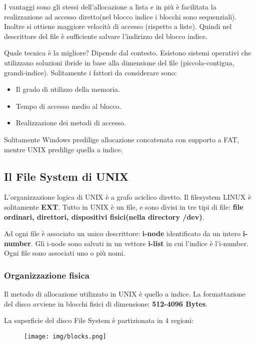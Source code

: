 \documentclass{article}
\begin{document}
\noindent I vantaggi sono gli stessi dell'allocazione a lista 
e in più è facilitata la realizzazione ad accesso diretto(nel blocco 
indice i blocchi sono sequenziali). Inoltre si ottiene
maggiore velocità di accesso (rispetto a liste).
\noindent Quindi nel descrittore del file è sufficiente 
salvare l'indirizzo del blocco indice.
\medskip

\noindent Quale tecnica è la migliore? Dipende dal contesto. 
Esistono sistemi operativi che utilizzano soluzioni ibride in base
alla dimensione del file (piccola-contigua, grandi-indice).
Solitamente i fattori da considerare sono:
\begin{itemize}
    \item Il grado di utilizzo della memoria.
    \item Tempo di accesso medio al blocco.
    \item Realizzazione dei metodi di accesso.
\end{itemize}

\noindent Solitamente Windows predilige allocazione concatenata con
supporto a FAT, mentre UNIX predilige quella a indice.

\subsection{Il File System di UNIX}
L'organizzazione logica di UNIX è a grafo aciclico diretto.
Il filesystem LINUX è solitamente \textbf{EXT}.
Tutto in UNIX è un file, e sono divisi in tre tipi di file:
\textbf{file ordinari, direttori, dispositivi fisici(nella directory
/dev)}.

\noindent Ad ogni file è associato un unico descrittore: \textbf{i-node} 
identificato da un intero \textbf{i-number}. Gli i-node 
sono salvati in un vettore \textbf{i-list} in cui l'indice 
è l'i-number. 
\noindent Ogni file sono associati uno o più nomi.

\subsubsection{Organizzazione fisica}
\noindent Il metodo di allocazione utilizzato in UNIX è quello 
a indice. La formattazione del disco avviene in blocchi fisici di 
dimensione: \textbf{512-4096 Bytes}.

\noindent La superficie del disco File System è partizionata in 4 
regioni:

\begin{figure}[h!]
    \begin{center}
        \texttt{[image: img/blocks.png]}      
    \end{center}
\end{figure}
\end{document}
